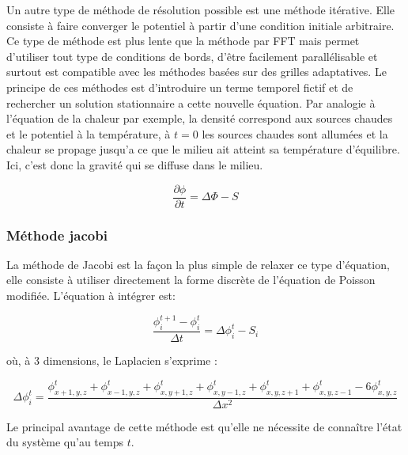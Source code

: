 Un autre type de méthode de résolution possible est une méthode itérative. 
Elle consiste à faire converger le potentiel à partir d'une condition initiale arbitraire. 
Ce type de méthode est plus lente que la méthode par FFT mais permet d'utiliser tout type de conditions de bords, d'être facilement parallélisable et surtout est compatible avec les méthodes basées sur des grilles adaptatives.
Le principe de ces méthodes est d'introduire un terme temporel fictif et de rechercher un solution stationnaire a cette nouvelle équation.
Par analogie à l'équation de la chaleur par exemple, la densité correspond aux sources chaudes et le potentiel à la température, à $t=0$ les sources chaudes sont allumées et la chaleur se propage jusqu'a ce que le milieu ait atteint sa température d'équilibre. 
Ici, c'est donc la gravité qui se diffuse dans le milieu.

\begin{equation}
\dfrac{\partial \phi}{\partial t} = \Delta \Phi -S 
\end{equation}

\subsubsection{Méthode jacobi}

La méthode de Jacobi est la façon la plus simple de relaxer ce type d'équation, elle consiste à utiliser directement la forme discrète de l'équation de Poisson modifiée. 
L'équation à intégrer est:

\[ \dfrac{\phi^{t+1}_i - \phi^{t}_i}{\Delta t}  =  \Delta \phi_i^t - S_i \]

où, à 3 dimensions, le Laplacien s'exprime :

\[ \Delta \phi_i^t = \dfrac{\phi_{x+1,y,z}^t  + \phi_{x-1,y,z}^t + \phi_{x,y+1,z}^t  + \phi_{x,y-1,z}^t + \phi_{x,y,z+1}^t + \phi_{x,y,z-1}^t	- 6\phi_{x,y,z}^t}{\Delta x ^2} \]
		
Le principal avantage de cette méthode est qu'elle ne nécessite de connaître l'état du système qu'au temps $t$.

